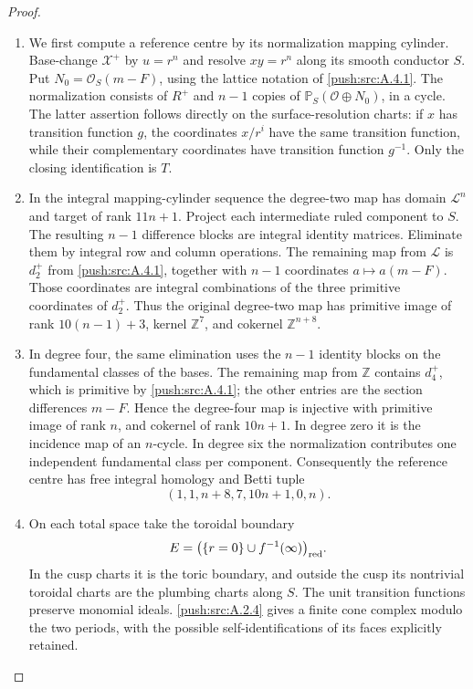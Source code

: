 \begin{proof}
\begin{enumerate}[label=\arabic*.,leftmargin=*]
\item We first compute a reference centre by its normalization
mapping cylinder. Base-change $\mathcal X^+$ by $u=r^n$
and resolve $xy=r^n$ along its smooth conductor $S$.
Put $N_0=\mathcal O_S(m-F)$, using the lattice notation
of \ref{push:src:A.4.1}. The normalization consists of $R^+$ and
$n-1$ copies of $\mathbb P_S(\mathcal O\oplus N_0)$,
in a cycle. The latter assertion follows directly on
the surface-resolution charts: if $x$ has transition
function $g$, the coordinates $x/r^i$ have the same
transition function, while their complementary
coordinates have transition function $g^{-1}$.
Only the closing identification is $T$.

\item In the integral mapping-cylinder sequence the degree-two
map has domain $\mathcal L^n$ and target of rank $11n+1$.
Project each intermediate ruled component to $S$.
The resulting $n-1$ difference blocks are integral
identity matrices. Eliminate them by integral row and
column operations. The remaining map from $\mathcal L$
is $d_2^+$ from \ref{push:src:A.4.1}, together with $n-1$ coordinates
$a\mapsto a(m-F)$. Those coordinates are integral
combinations of the three primitive coordinates of
$d_2^+$. Thus the original degree-two map has primitive
image of rank $10(n-1)+3$, kernel $\mathbb Z^7$, and
cokernel $\mathbb Z^{n+8}$.

\item In degree four, the same elimination uses the $n-1$
identity blocks on the fundamental classes of the bases.
The remaining map from $\mathbb Z$ contains $d_4^+$,
which is primitive by \ref{push:src:A.4.1}; the other entries are the
section differences $m-F$. Hence the degree-four map
is injective with primitive image of rank $n$, and
cokernel of rank $10n+1$. In degree zero it is the
incidence map of an $n$-cycle. In degree six the
normalization contributes one independent fundamental
class per component. Consequently the reference centre
has free integral homology and Betti tuple
\[
 (1,1,n+8,7,10n+1,0,n).
\]

\item On each total
space take the toroidal boundary
\[
 E=\bigl(\{r=0\}\cup f^{-1}(\infty)\bigr)_{\rm red}.
\]
In the cusp charts it is the toric boundary, and outside
the cusp its nontrivial toroidal charts are the plumbing
charts along $S$. The unit transition functions preserve
monomial ideals. \ref{push:src:A.2.4} gives a finite cone complex modulo
the two periods, with the possible self-identifications
of its faces explicitly retained.


\end{enumerate}
\end{proof}
